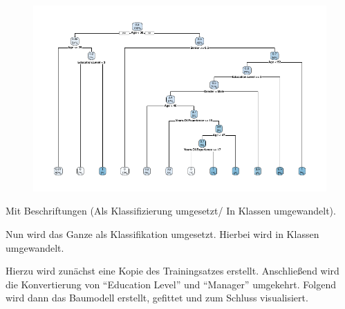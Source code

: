 \documentclass[
  letterpaper,
  DIV=11,
  numbers=noendperiod]{scrartcl}
\begin{document}
\begin{figure}[H]

{\centering \includegraphics{main_doc_files/figure-pdf/unnamed-chunk-169-1.pdf}

}

\end{figure}

Mit Beschriftungen (Als Klassifizierung umgesetzt/ In Klassen
umgewandelt).

Nun wird das Ganze als Klassifikation umgesetzt. Hierbei wird in Klassen
umgewandelt.

Hierzu wird zunächst eine Kopie des Trainingsatzes erstellt.
Anschließend wird die Konvertierung von ``Education Level'' und
``Manager'' umgekehrt. Folgend wird dann das Baumodell erstellt,
gefittet und zum Schluss visualisiert.
\end{document}
